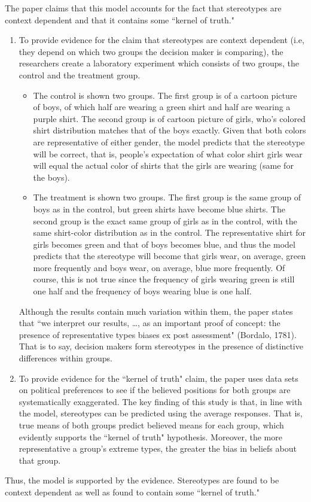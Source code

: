 \documentclass[12pt]{article}
\theoremstyle{definition}
\numberwithin{equation}{section}
\begin{document}
\begin{flushleft}
The paper claims that this model accounts for the fact that stereotypes are context dependent and that it contains some ``kernel of truth."
\begin{enumerate}
\item To provide evidence for the claim that stereotypes are context dependent (i.e, they depend on which two groups the decision maker is comparing), the researchers create a laboratory experiment which consists of two groups, the control and the treatment group. 
\begin{itemize}
\item The control is shown two groups. The first group is of a cartoon picture of boys, of which half are wearing a green shirt and half are wearing a purple shirt. The second group is of cartoon picture of girls, who's colored shirt distribution matches that of the boys exactly. Given that both colors are representative of either gender, the model predicts that the stereotype will be correct, that is, people's expectation of what color shirt girls wear will equal the actual color of shirts that the girls are wearing (same for the boys).
\item The treatment is shown two groups. The first group is the same group of boys as in the control, but green shirts have become blue shirts. The second group is the exact same group of girls as in the control, with the same shirt-color distribution as in the control. The representative shirt for girls becomes green and that of boys becomes blue, and thus the model predicts that the stereotype will become that girls wear, on average, green more frequently and boys wear, on average, blue more frequently. Of course, this is not true since the frequency of girls wearing green is still one half and the frequency of boys wearing blue is one half.  
\end{itemize}
Although the results contain much variation within them, the paper states that  ``we interpret our results, \dots, as an important proof of concept: the presence of representative types biases ex post assessment" (Bordalo, 1781). That is to say, decision makers form stereotypes in the presence of distinctive differences within groups.

\item To provide evidence for the ``kernel of truth" claim, the paper uses data sets on political preferences to see if the believed positions for both groups are systematically exaggerated. The key finding of this study is that, in line with the model, stereotypes can be predicted using the average responses. That is, true means of both groups predict believed means for each group, which evidently supports the ``kernel of truth" hypothesis. Moreover, the more representative a group’s extreme types, the greater the bias in beliefs about that group.
\end{enumerate}
Thus, the model is supported by the evidence. Stereotypes are found to be context dependent as well as found to contain some ``kernel of truth."


\end{flushleft}
\end{document}
